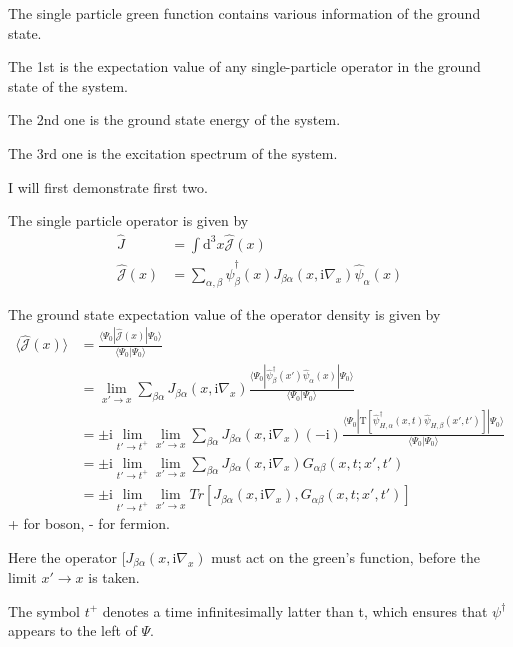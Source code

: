 The single particle green function contains various information of the ground state.

The 1st is the expectation value of any single-particle operator in the ground state of the system.

The 2nd one is the ground state energy of the system.

The 3rd one is the excitation spectrum of the system.

I will first demonstrate first two.

The single particle operator is given by
\begin{align}
\hat{J}&=\int \mathrm{d}^3x \hat{\mathcal{J}}(x) \nonumber \\
\hat{\mathcal{J}}(x) &=\sum_{\alpha,\beta}\hat \psi^{\dagger}_{\beta}(x)J_{\beta\alpha}(x,\mathrm{i}\nabla_x)\hat \psi_{\alpha}(x) \nonumber
\end{align}

The ground state expectation value of the operator density is given by 
\begin{align}
\langle\hat{\mathcal{J}}(x)\rangle&=\frac{\langle\Psi_0|\hat{\mathcal{J}}(x)|\Psi_0\rangle}{\langle\Psi_0|\Psi_0\rangle} \nonumber \\
&= \lim_{x'\rightarrow x}\sum_{\beta\alpha}J_{\beta\alpha}(x,\mathrm{i}\nabla_x)\frac{\langle\Psi_0|\hat \psi^{
\dagger}_{\beta}(x')\hat \psi_{\alpha}(x)|\Psi_0\rangle}{\langle\Psi_0|\Psi_0\rangle} \nonumber \\
&=\pm \mathrm{i} \lim_{t'\rightarrow t^+} \lim_{x'\rightarrow x}\sum_{\beta\alpha}J_{\beta\alpha}(x,\mathrm{i}\nabla_x)(-\mathrm{i})\frac{\langle\Psi_0|\mathrm{T}[\hat \psi^{
\dagger}_{H,\alpha}(x,t)\hat \psi_{H,\beta} (x',t')]|\Psi_0\rangle}{\langle\Psi_0|\Psi_0\rangle} \nonumber \\
&=\pm \mathrm{i} \lim_{t'\rightarrow t^+} \lim_{x'\rightarrow x}\sum_{\beta\alpha}J_{\beta\alpha}(x,\mathrm{i}\nabla_x)G_{\alpha\beta}(x,t;x',t') \nonumber \\
&=\pm \mathrm{i} \lim_{t'\rightarrow t^+} \lim_{x'\rightarrow x} Tr[J_{\beta\alpha}(x,\mathrm{i}\nabla_x),G_{\alpha\beta}(x,t;x',t')] \nonumber
\end{align}
+ for boson, - for fermion.

Here the operator $[J_{\beta\alpha}(x,\mathrm{i}\nabla_x)$ must act on the green's function, before the limit $x'\rightarrow x$ is taken.

The symbol $t^+$ denotes a time infinitesimally latter than t, which ensures that $\psi^{\dagger}$ appears to the left of $\Psi$.

